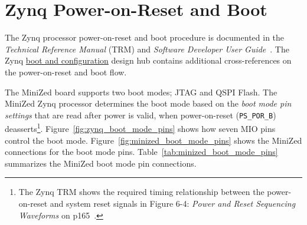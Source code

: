 \section{Zynq Power-on-Reset and Boot}
\label{sec:zynq_boot}

The Zynq processor power-on-reset and boot procedure is documented in the
\emph{Technical Reference Manual} (TRM) and \emph{Software Developer
User Guide}~\cite{Xilinx_UG585_2021,Xilinx_UG821_2015}. The Zynq
\href{https://www.xilinx.com/support/documentation-navigation/design-hubs/dh0053-zynq-7000-boot-and-config-hub.html}{boot and configuration}
design hub contains additional cross-references on the power-on-reset
and boot flow.

The MiniZed board supports two boot modes; JTAG and QSPI Flash.
%
The MiniZed Zynq processor determines the boot mode based on the
\emph{boot mode pin settings} that are read after power is valid,
when power-on-reset (\verb+PS_POR_B+) deasserts\footnote{The Zynq TRM
shows the required timing relationship between the power-on-reset
and system reset signals in Figure 6-4: \emph{Power and Reset Sequencing
Waveforms} on p165~\cite{Xilinx_UG585_2021}.}.
%
Figure~\ref{fig:zynq_boot_mode_pins} shows how seven MIO pins control
the boot mode. Figure~\ref{fig:minized_boot_mode_pins} shows the
MiniZed connections for the boot mode pins.
Table~\ref{tab:minized_boot_mode_pins} summarizes the MiniZed boot mode
pin connections.

